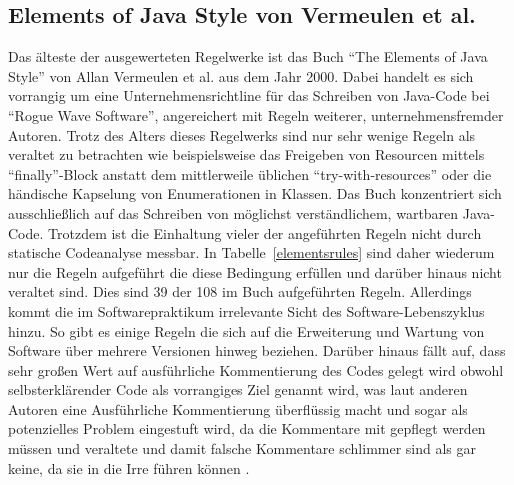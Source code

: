 \documentclass[da,ngerman]{stthesis}
\begin{document}
			\subsection{Elements of Java Style von Vermeulen et al.}
				Das älteste der ausgewerteten Regelwerke ist das Buch "`The Elements of Java Style"' von Allan Vermeulen et al. \cite{ElementsOfJavaStyle} aus dem Jahr 2000. Dabei handelt es sich vorrangig um eine Unternehmensrichtline für das Schreiben von Java-Code bei "`Rogue Wave\textsuperscript{\textregistered} Software"', angereichert mit Regeln weiterer, unternehmensfremder Autoren. Trotz des Alters dieses Regelwerks sind nur sehr wenige Regeln als veraltet zu betrachten wie beispielsweise das Freigeben von Resourcen mittels "`finally"'-Block anstatt dem mittlerweile üblichen "`try-with-resources"' oder die händische Kapselung von Enumerationen in Klassen. \newline
				Das Buch konzentriert sich ausschließlich auf das Schreiben von möglichst verständlichem, wartbaren Java-Code. Trotzdem ist die Einhaltung vieler der angeführten Regeln nicht durch statische Codeanalyse messbar. In Tabelle~\ref{elementsrules} sind daher wiederum nur die Regeln aufgeführt die diese Bedingung erfüllen und darüber hinaus nicht veraltet sind. Dies sind 39 der 108 im Buch aufgeführten Regeln. \newline
				Allerdings kommt die im Softwarepraktikum irrelevante Sicht des Software-Lebenszyklus hinzu. So gibt es einige Regeln die sich auf die Erweiterung und Wartung von Software über mehrere Versionen hinweg beziehen. Darüber hinaus fällt auf, dass sehr großen Wert auf ausführliche Kommentierung des Codes gelegt wird obwohl selbsterklärender Code als vorrangiges Ziel genannt wird, was laut anderen Autoren eine Ausführliche Kommentierung überflüssig macht und sogar als potenzielles Problem eingestuft wird, da die Kommentare mit gepflegt werden müssen und veraltete und damit falsche Kommentare schlimmer sind als gar keine, da sie in die Irre führen können \cite{CleanCode}.
\end{document}
